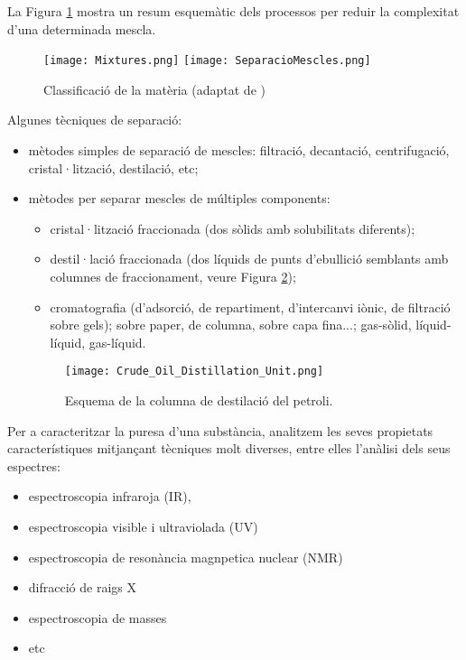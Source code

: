 La Figura \ref{fig:SeparacioMescles} mostra un resum esquemàtic dels processos per reduir la complexitat d'una determinada mescla.

\begin{figure}[h]
\centering
\texttt{[image: Mixtures.png]}
\texttt{[image: SeparacioMescles.png]}
\caption{Classificació de la matèria (adaptat de \citep{caamano_ros_quimica_1991})}
\label{fig:SeparacioMescles}
\end{figure}

Algunes tècniques de separació:
\begin{itemize}
\item mètodes simples de separació de mescles: filtració, decantació, centrifugació, cristal·lització, destilació, etc;
\item mètodes per separar mescles de múltiples components: 
\begin{itemize}
\item cristal·lització fraccionada (dos sòlids amb solubilitats diferents);
\item destil·lació fraccionada (dos líquids de punts d'ebullició semblants amb columnes de fraccionament, veure Figura \ref{fig:Crude_Oil_Distillation_Unit});
\item cromatografia (d'adsorció, de repartiment, d'intercanvi iònic, de filtració sobre gels); sobre paper, de columna, sobre capa fina...; gas-sòlid, líquid-líquid, gas-líquid.
\end{itemize}  
\begin{figure}[h]
\centering
\texttt{[image: Crude\_Oil\_Distillation\_Unit.png]}
\caption{Esquema de la columna de destilació del petroli.}
\label{fig:Crude_Oil_Distillation_Unit}
\end{figure}
\end{itemize}

Per a caracteritzar la puresa d'una substància, analitzem les seves propietats característiques mitjançant tècniques molt diverses, entre elles l'anàlisi dels seus espectres:
\begin{itemize}
\item espectroscopia infraroja (IR), 
\item espectroscopia visible i ultraviolada (UV)
\item espectroscopia de resonància magnpetica nuclear (NMR)
\item difracció de raigs X
\item espectroscopia de masses
\item etc
\end{itemize}

